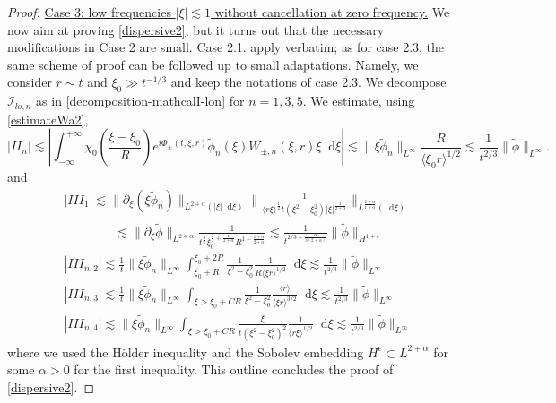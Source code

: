 \documentclass[11 pt]{amsart}
\theoremstyle{definition}
\theoremstyle{remark}
\numberwithin{equation}{section}
\newcommand{\dd}{\mathop{}\!\mathrm{d}}
\begin{document}
\begin{proof}
\medskip

\noindent \underline{Case 3: low frequencies $|\xi| \lesssim 1$ without cancellation at zero frequency.} We now aim at proving \eqref{dispersive2}, but it turns out that the necessary modifications in Case 2 are small. Case 2.1. apply verbatim; as for case 2.3, the same scheme of proof can be followed up to small adaptations. Namely, we consider $r \sim t$ and $\xi_0 \gg t^{-1/3}$ and keep the notations of case 2.3. We decompose $\mathcal I_{lo,n}$ as in \eqref{decomposition-mathcalI-lon} for $n=1,3,5$. We estimate, using \eqref{estimateWa2},
$$
|II_n| \lesssim \left|  \int_{-\infty}^{+\infty} \chi_0\left(\frac{\xi-\xi_0}{R}\right)e^{i \Phi_{\pm}(t,\xi,r)} \widetilde{\phi}_n(\xi) W_{\pm,n}(\xi,r) \xi \dd \xi \right| \lesssim \|\xi \widetilde{\phi}_n \|_{L^\infty} \frac{ R}{\langle \xi_0 r \rangle^{1/2}} \lesssim \frac{1}{t^{2/3}}  \| \widetilde{\phi} \|_{L^\infty} .
$$
and
\begin{align*}
& |III_1| \lesssim \| \partial_\xi (\xi \widetilde{\phi}_n)\|_{L^{2+\alpha}(|\xi|\dd \xi)}\| \frac{1}{\langle r \xi \rangle^{\frac 12}t (\xi^2-\xi_0^2)|\xi|^{\frac{1}{2+\alpha}}}\|_{L^{\frac{2+\alpha}{1+\alpha}}(\dd \xi)} \\
& \qquad \qquad \lesssim \| \partial_\xi \widetilde \phi \|_{L^{2+\alpha}}\frac{1}{t^{\frac 32}\xi_0^{\frac 32+\frac{1}{2+\alpha}}R^{1-\frac{1+\alpha}{2+\alpha}}} \lesssim\frac{1}{t^{2/3+\frac{\alpha}{3(2+\alpha)}}} \| \widetilde \phi\|_{H^{1+\epsilon}}  \\
& |III_{n,2}| \lesssim \frac{1}{t} \| \xi  \widetilde{\phi}_n \|_{L^\infty} \int_{ \xi_0 + R}^{\xi_0+2R} \frac{1}{\xi^2 - \xi_0^2} \frac{1}{R \langle \xi r \rangle^{1/2}} \dd \xi \lesssim \frac 1 {t^{2/3}}  \| \widetilde{\phi} \|_{L^\infty}\\
& |III_{n,3}| \lesssim \frac{1}{t} \| \xi \widetilde{\phi}_n \|_{L^\infty} \int_{\xi > \xi_0 + CR} \frac{1}{\xi^2 - \xi_0^2} \frac{\langle r \rangle}{\langle \xi r \rangle^{3/2}} \dd \xi \lesssim \frac 1 {t^{2/3}}  \| \widetilde{\phi} \|_{L^\infty}\\
& |III_{n,4}| \lesssim \| \xi \widetilde{\phi}_n \|_{L^\infty} \int_{\xi > \xi_0 + CR} \frac{\xi}{t(\xi^2 - \xi_0^2)^2} \frac{1}{\langle r\xi \rangle^{1/2}} \dd \xi \lesssim \frac 1 {t^{2/3}}  \| \widetilde{\phi} \|_{L^\infty}
\end{align*}
where we used the H\"older inequality and the Sobolev embedding $H^{\epsilon}\subset L^{2+\alpha}$ for some $\alpha>0$ for the first inequality. This outline concludes the proof of \eqref{dispersive2}.
\end{proof}
\end{document}
